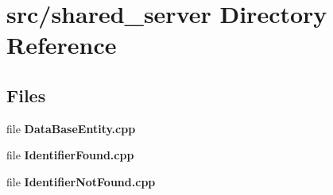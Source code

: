 \section{src/shared\+\_\+server Directory Reference}
\label{dir_30f9d8d923e768f9a22e7fd6ee21b3ad}
\subsection*{Files}
\begin{DoxyCompactItemize}
\item 
file {\bf Data\+Base\+Entity.\+cpp}
\item 
file {\bf Identifier\+Found.\+cpp}
\item 
file {\bf Identifier\+Not\+Found.\+cpp}
\end{DoxyCompactItemize}
